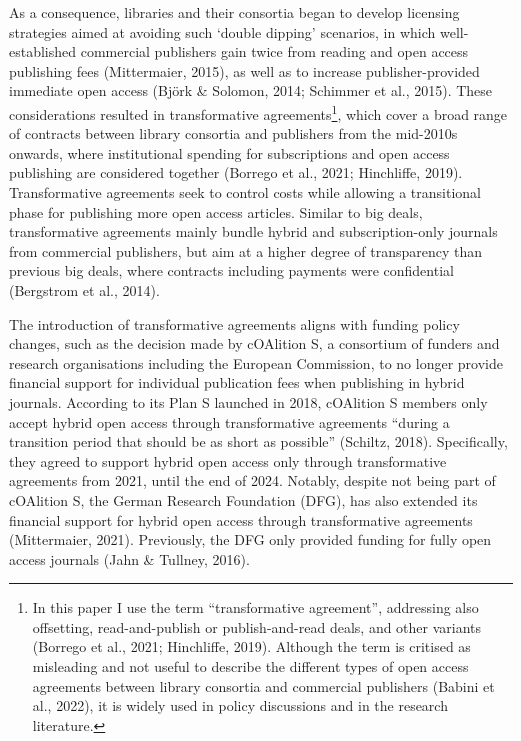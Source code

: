 \documentclass[a4paper,man,floatsintext,longtable,noextraspace,12pt]{apa6}
\begin{document}
As a consequence, libraries and their consortia began to develop
licensing strategies aimed at avoiding such `double dipping' scenarios,
in which well-established commercial publishers gain twice from reading
and open access publishing fees (Mittermaier, 2015), as well as to
increase publisher-provided immediate open access (Björk \& Solomon,
2014; Schimmer et al., 2015). These considerations resulted in
transformative agreements\footnote{In this paper I use the term
  ``transformative agreement'', addressing also offsetting,
  read-and-publish or publish-and-read deals, and other variants
  (Borrego et al., 2021; Hinchliffe, 2019). Although the term is
  critised as misleading and not useful to describe the different types
  of open access agreements between library consortia and commercial
  publishers (Babini et al., 2022), it is widely used in policy
  discussions and in the research literature.}, which cover a broad
range of contracts between library consortia and publishers from the
mid-2010s onwards, where institutional spending for subscriptions and
open access publishing are considered together (Borrego et al., 2021;
Hinchliffe, 2019). Transformative agreements seek to control costs while
allowing a transitional phase for publishing more open access articles.
Similar to big deals, transformative agreements mainly bundle hybrid and
subscription-only journals from commercial publishers, but aim at a
higher degree of transparency than previous big deals, where contracts
including payments were confidential (Bergstrom et al., 2014).

The introduction of transformative agreements aligns with funding policy
changes, such as the decision made by cOAlition S, a consortium of
funders and research organisations including the European Commission, to
no longer provide financial support for individual publication fees when
publishing in hybrid journals. According to its Plan S launched in 2018,
cOAlition S members only accept hybrid open access through
transformative agreements ``during a transition period that should be as
short as possible'' (Schiltz, 2018). Specifically, they agreed to
support hybrid open access only through transformative agreements from
2021, until the end of 2024. Notably, despite not being part of
cOAlition S, the German Research Foundation (DFG), has also extended its
financial support for hybrid open access through transformative
agreements (Mittermaier, 2021). Previously, the DFG only provided
funding for fully open access journals (Jahn \& Tullney, 2016).
\end{document}

